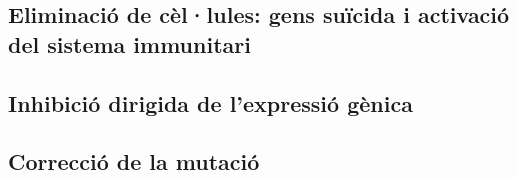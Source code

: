 

\subsection{Eliminació de cèl·lules: gens suïcida i activació del
  sistema immunitari}
\label{sec:elim-de-cel.l}


\subsection{Inhibició dirigida de l'expressió gènica}
\label{sec:inhib-dirig-de}


\subsection{Correcció de la mutació}
\label{sec:correccio-de-la}

